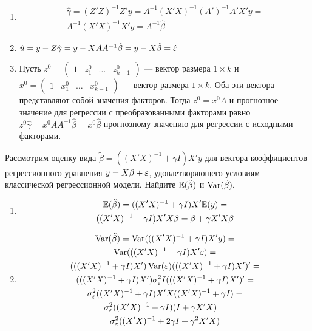 \documentclass[pdftex,11pt,openany]{book}\usepackage[]{graphicx}\usepackage[]{color}
\begin{document}
\begin{solution}
\begin{enumerate}
\item 
\begin{multline}
\hat{\gamma} = (Z'Z)^{-1}Z'y = A^{-1}(X'X)^{-1}(A')^{-1}A'X'y =\\
 A^{-1}(X'X)^{-1} X'y = A^{-1}\hat{\beta}
\end{multline}
\item $\hat{u} = y - Z\hat{\gamma} = y - XAA^{-1}\hat{\beta} = y - X\hat{\beta} = \hat{\varepsilon}$
\item Пусть $z^0 = \begin{pmatrix} 1 & z_1^0 & \dots & z_{k-1}^0 \end{pmatrix}$ --- вектор размера $1 \times k$ и $x^0 = \begin{pmatrix} 1 & x_1^0 & \dots & x_{k-1}^0 \end{pmatrix}$ --- вектор размера $1 \times k$. Оба эти вектора представляют собой значения факторов. Тогда $z^0 = x^0 A$ и прогнозное значение для регрессии с преобразованными факторами равно $z^0 \hat{\gamma} = x^0 AA^{-1} \hat{\beta} = x^0 \hat{\beta}$ прогнозному значению для регрессии с исходными факторами. 
\end{enumerate}
\end{solution}


\begin{problem}
Рассмотрим оценку вида $\tilde{\beta} = ((X'X)^{-1} + \gamma I)X'y$ для вектора коэффициентов регрессионного уравнения $y = X\beta + \varepsilon$, удовлетворяющего условиям классической регрессионной модели. Найдите $\mathbb{E}(\tilde{\beta})$ и $\operatorname{Var}(\tilde{\beta}).$ 
\end{problem}

\begin{solution}
\begin{enumerate}
\item 
\begin{multline}
\mathbb{E}(\tilde{\beta}) = ((X'X)^{-1} + \gamma I)X'\mathbb{E}(y) = \\
 ((X'X)^{-1} + \gamma I)X'X\beta = \beta + \gamma X'X\beta
\end{multline}
\item 
\begin{multline}
\operatorname{Var}(\tilde{\beta}) = \operatorname{Var}(((X'X)^{-1} + \gamma I)X'y) = \\
 \operatorname{Var}(((X'X)^{-1} + \gamma I)X'\varepsilon) = \\
 (((X'X)^{-1} + \gamma I)X')\operatorname{Var}(\varepsilon)(((X'X)^{-1} + \gamma I)X')'=  \\
  (((X'X)^{-1} + \gamma I)X')\sigma_{\varepsilon}^2 I(((X'X)^{-1} + \gamma I)X')'= \\
  \sigma_{\varepsilon}^2((X'X)^{-1} + \gamma I)X'X((X'X)^{-1} + \gamma I) = \\
  \sigma_{\varepsilon}^2((X'X)^{-1} + \gamma I)(I + \gamma X'X) =\\
   \sigma_{\varepsilon}^2((X'X)^{-1} + 2\gamma I + \gamma ^2 X'X)
\end{multline}
\end{enumerate}
\end{solution}
\end{document}
